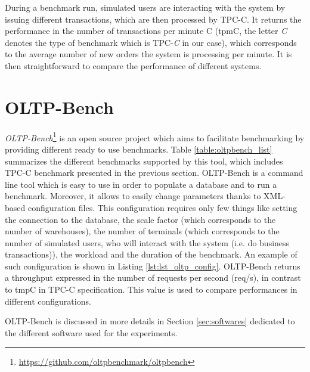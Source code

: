 During a benchmark run, simulated users are interacting with the system by issuing different transactions, which are then processed by TPC-C.
It returns the performance in the number of transactions per minute C (tpmC, the letter \textit{C} denotes the type of benchmark which is TPC-\textit{C} in our case), which corresponds to the average number of new orders the system is processing per minute.
It is then straightforward to compare the performance of different systems.



\section{OLTP-Bench}
\textit{OLTP-Bench}\footnote{\url{https://github.com/oltpbenchmark/oltpbench}} is an open source project which aims to facilitate benchmarking by providing different ready to use benchmarks. 
Table \ref{table:oltpbench_list} summarizes the different benchmarks supported by this tool, which includes TPC-C benchmark presented in the previous section.
OLTP-Bench is a command line tool which is easy to use in order to populate a database and to run a benchmark.
Moreover, it allows to easily change parameters thanks to XML-based configuration files.
This configuration requires only few things like setting the connection to the database, the scale factor (which corresponds to the number of warehouses), the number of terminals (which corresponds to the number of simulated users, who will interact with the system (i.e. do business transactions)), the workload and the duration of the benchmark.
An example of such configuration is shown in Listing \ref{lst:lst_oltp_config}.
OLTP-Bench returns a throughput expressed in the number of requests per second (req/s), in contrast to tmpC in TPC-C specification.
This value is used to compare performances in different configurations.

OLTP-Bench is discussed in more details in Section \ref{sec:softwares} dedicated to the different software used for the experiments.

